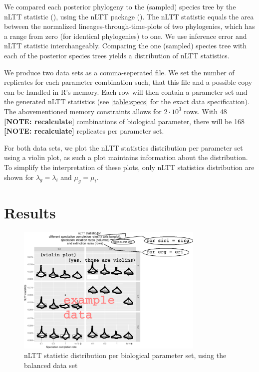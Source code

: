 \documentclass{article}
\begin{document}
We compared each posterior phylogeny to the (sampled) species tree
by the nLTT statistic (\cite{janzen2015}), using the nLTT package (\cite{nltt}). 
The nLTT statistic equals the area between the normalized
lineages-through-time-plots of two phylogenies, which has a range 
from zero (for identical phylogenies) to one. We use inference error 
and nLTT statistic interchangeably. Comparing the one (sampled) species tree
with each of the posterior species trees yields a distribution of nLTT statistics. 

We produce two data sets as a comma-seperated file.
We set the number of replicates for each parameter combination such,
that this file and a possible copy can be handled in R's memory.
Each row will then contain a parameter set and the generated nLTT 
statistics (see \ref{table:specs} for the exact data specification).
The abovementioned memory constraints allows for $2 \cdot 10^3$ rows. 
With 48 \textbf{[NOTE: recalculate]} combinations of biological parameter, there will be 
168 \textbf{[NOTE: recalculate]} replicates per parameter set.

For both data sets, we plot the nLTT statistics distribution per
parameter set using a violin plot, as such a plot 
maintains information about the distribution. To simplify the interpretation
of these plots, only nLTT statistics distribution are shown 
for $\lambda_g = \lambda_i$ and $\mu_g = \mu_i$.

\section{Results}

\begin{figure}[!htbp]
  \includegraphics[width=0.8\textwidth]{fig_nltt_stats_per_setup.png}
  \caption{
    nLTT statistic distribution per biological parameter set, using the
    balanced data set
  }
\end{figure}
\end{document}
